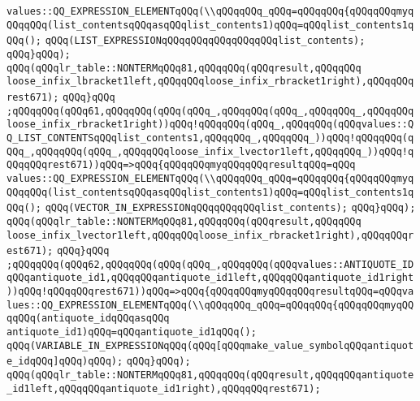 \verb|values::QQ_EXPRESSION_ELEMENTqQQq(\\qQQqqQQq_qQQq=qQQqqQQq{qQQqqQQqmyqQQqqQQq(list_contentsqQQqasqQQqlist_contents1)qQQq=qQQqlist_contents1qQQq();|\newline
\verb|qQQq(LIST_EXPRESSIONqQQqqQQqqQQqqQQqqQQqlist_contents);|\newline
\verb|qQQq}qQQq);|\newline
\verb|qQQq(qQQqlr_table::NONTERMqQQq81,qQQqqQQq(qQQqresult,qQQqqQQq|\newline
\verb|loose_infix_lbracket1left,qQQqqQQqloose_infix_rbracket1right),qQQqqQQqrest671);|\newline
\verb|qQQq}qQQq|\newline
\verb|;qQQqqQQq(qQQq61,qQQqqQQq(qQQq(qQQq_,qQQqqQQq(qQQq_,qQQqqQQq_,qQQqqQQqloose_infix_rbracket1right))qQQq!qQQqqQQq(qQQq_,qQQqqQQq(qQQqvalues::QQ_LIST_CONTENTSqQQqlist_contents1,qQQqqQQq_,qQQqqQQq_))qQQq!qQQqqQQq(qQQq_,qQQqqQQq(qQQq_,qQQqqQQqloose_infix_lvector1left,qQQqqQQq_))qQQq!qQQqqQQqrest671))qQQq=>qQQq{qQQqqQQqmyqQQqqQQqresultqQQq=qQQq|\newline
\verb|values::QQ_EXPRESSION_ELEMENTqQQq(\\qQQqqQQq_qQQq=qQQqqQQq{qQQqqQQqmyqQQqqQQq(list_contentsqQQqasqQQqlist_contents1)qQQq=qQQqlist_contents1qQQq();|\newline
\verb|qQQq(VECTOR_IN_EXPRESSIONqQQqqQQqqQQqlist_contents);|\newline
\verb|qQQq}qQQq);|\newline
\verb|qQQq(qQQqlr_table::NONTERMqQQq81,qQQqqQQq(qQQqresult,qQQqqQQq|\newline
\verb|loose_infix_lvector1left,qQQqqQQqloose_infix_rbracket1right),qQQqqQQqrest671);|\newline
\verb|qQQq}qQQq|\newline
\verb|;qQQqqQQq(qQQq62,qQQqqQQq(qQQq(qQQq_,qQQqqQQq(qQQqvalues::ANTIQUOTE_IDqQQqantiquote_id1,qQQqqQQqantiquote_id1left,qQQqqQQqantiquote_id1right))qQQq!qQQqqQQqrest671))qQQq=>qQQq{qQQqqQQqmyqQQqqQQqresultqQQq=qQQqvalues::QQ_EXPRESSION_ELEMENTqQQq(\\qQQqqQQq_qQQq=qQQqqQQq{qQQqqQQqmyqQQqqQQq(antiquote_idqQQqasqQQq|\newline
\verb|antiquote_id1)qQQq=qQQqantiquote_id1qQQq();|\newline
\verb|qQQq(VARIABLE_IN_EXPRESSIONqQQq(qQQq[qQQqmake_value_symbolqQQqantiquote_idqQQq]qQQq)qQQq);|\newline
\verb|qQQq}qQQq);|\newline
\verb|qQQq(qQQqlr_table::NONTERMqQQq81,qQQqqQQq(qQQqresult,qQQqqQQqantiquote_id1left,qQQqqQQqantiquote_id1right),qQQqqQQqrest671);|\newline
